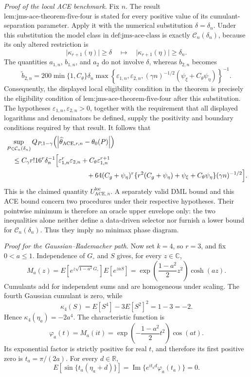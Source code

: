 \emph{Proof of the local ACE benchmark.}
Fix \(n\).  The result \(\text{lem:jms-ace-theorem-five-four}\) is stated for every positive value of its cumulant-separation parameter.  Apply it with the numerical substitution \(\delta=\delta_n\).  Under this substitution the model class in \(\text{def:jms-ace-class}\) is exactly \(\mathcal C_n(\delta_n)\), because its only altered restriction is
\[
 \lvert\kappa_{r+1}(\eta)\rvert\geq\delta
 \quad\longmapsto\quad
 \lvert\kappa_{r+1}(\eta)\rvert\geq\delta_n.
\]
The quantities \(a_{1,n}\), \(b_{1,n}\), and \(a_2\) do not involve \(\delta\), whereas \(b_{2,n}\) becomes
\[
 \widetilde b_{2,n}
 =200\min\{1,C_{\theta}\}\delta_n
 \max\!\left\{
   \varepsilon_{1,n},\varepsilon_{2,n},
   (\gamma n)^{-1/2}(\psi_{\xi}+C_{\theta}\psi_{\eta})
 \right\}^{-1}.
\]
Consequently, the displayed local eligibility condition in the theorem is precisely the eligibility condition of \(\text{lem:jms-ace-theorem-five-four}\) after this substitution.  The hypotheses \(\varepsilon_{1,n},\varepsilon_{2,n}>0\), together with the requirement that all displayed logarithms and denominators be defined, supply the positivity and boundary conditions required by that result.  It follows that
\[
\begin{aligned}
 &\sup_{P\in\mathcal C_n(\delta_n)}
 Q_{P,1-\gamma}
 \!\left(\left|\widehat\theta_{\mathrm{ACE},r,n}-\theta_0(P)\right|\right)\\
 &\quad\leq
 C_{\gamma}r!16^r\delta_n^{-1}
 \Bigl[
   \varepsilon_{1,n}^r\varepsilon_{2,n}
   +C_{\theta}\varepsilon_{1,n}^{r+1}\\
 &\hspace{42mm}
   +64(C_g+\psi_{\eta})^r
    \{r^2(C_g+\psi_{\eta})+\psi_{\xi}+C_{\theta}\psi_{\eta}\}
    (\gamma n)^{-1/2}
 \Bigr].
\end{aligned}
\]
This is the claimed quantity \(U_{\mathrm{ACE},n}^{\mathrm{loc}}\).  A separately valid DML bound and this ACE bound concern two procedures under their respective hypotheses.  Their pointwise minimum is therefore an oracle upper envelope only: the two inequalities alone neither define a data-driven selector nor furnish a lower bound for \(\mathcal C_n(\delta_n)\).  Thus they imply no minimax phase diagram.

\emph{Proof for the Gaussian--Rademacher path.}
Now set \(k=4\), so \(r=3\), and fix \(0<a\leq1\).  Independence of \(G_{\circ}\) and \(S\) gives, for every \(z\in\mathbb C\),
\[
 M_a(z)
 =E[e^{z\sqrt{1-a^2}G_{\circ}}]E[e^{zaS}]
 =\exp\!\left(\frac{1-a^2}{2}z^2\right)\cosh(az).
\]
Cumulants add for independent sums and are homogeneous under scaling.  The fourth Gaussian cumulant is zero, while
\[
 \kappa_4(S)=E[S^4]-3E[S^2]^2=1-3=-2.
\]
Hence \(\kappa_4(\eta_a)=-2a^4\).  The characteristic function is
\[
 \varphi_a(t)=M_a(it)
 =\exp\!\left(-\frac{1-a^2}{2}t^2\right)\cos(at).
\]
Its exponential factor is strictly positive for real \(t\), and therefore its first positive zero is \(t_a=\pi/(2a)\).  For every \(d\in\mathbb R\),
\[
 E\!\left[\sin\{t_a(\eta_a+d)\}\right]
 =\operatorname{Im}\{e^{it_ad}\varphi_a(t_a)\}=0.
\]


